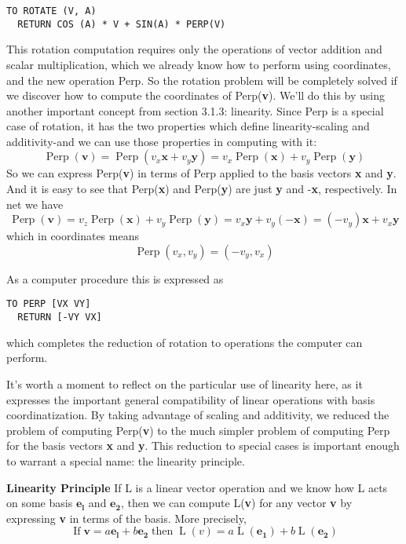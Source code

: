 \documentclass{book}
\begin{document}
\begin{verbatim}
TO ROTATE (V, A)
  RETURN COS (A) * V + SIN(A) * PERP(V)
\end{verbatim}
This rotation computation requires only the operations of vector addition and scalar multiplication, which we already know how to perform
using coordinates, and the new operation Perp. So the rotation problem
will be completely solved if we discover how to compute the coordinates
of Perp(\textbf{v}). We'll do this by using another important concept from section 3.1.3: linearity. Since Perp is a special case of rotation, it has the
two properties which define linearity-scaling and additivity-and we
can use those properties in computing with it:
$$\operatorname{Perp}(\mathbf{v}) = \operatorname{Perp}(v_x\mathbf{x} + v_y\mathbf{y}) = v_x\operatorname{Perp}(\mathbf{x}) + v_y\operatorname{Perp}(\mathbf{y})$$ So we can express Perp(\textbf{v}) in terms of Perp applied to the basis vectors
\textbf{x} and \textbf{y}. And it is easy to see that Perp(\textbf{x}) and Perp(\textbf{y}) are just
\textbf{y} and -\textbf{x}, respectively. In net we have
$$\operatorname{Perp}(\mathbf{v}) = v_z\operatorname{Perp}(\mathbf{x}) + v_y\operatorname{Perp}(\mathbf{y})= v_x\mathbf{y} + v_y(-\mathbf{x})= (-v_y)\mathbf{x} + v_x\textbf{y}$$
 which in coordinates means $$\operatorname{Perp}(v_x, v_y) = (-v_y, v_x)$$

As a computer procedure this is expressed as

\begin{verbatim}
TO PERP [VX VY]
  RETURN [-VY VX]
\end{verbatim}
which completes the reduction of rotation to operations the computer
can perform.

It's worth a moment to reflect on the particular use of linearity here, as
it expresses the important general compatibility of linear operations with
basis coordinatization. By taking advantage of scaling and additivity, we
reduced the problem of computing Perp(\textbf{v}) to the much simpler problem
of computing Perp for the basis vectors \textbf{x} and \textbf{y}. This reduction to
special cases is important enough to warrant a special name: the linearity
principle.

\noindent \textbf{Linearity Principle} If L is a linear vector operation and we know how L
acts on some basis $\mathbf{e_l}$ and $\mathbf{e_2}$, then we can compute L(\textbf{v}) for any vector
\textbf{v} by expressing \textbf{v} in terms of the basis. More precisely,
$$\operatorname{If} \mathbf{v} = a\mathbf{e_l} + b\mathbf{e_2} \operatorname{then} \operatorname{L}(v) = a\operatorname{L}(\mathbf{e_1}) + b\operatorname{L}(\mathbf{e_2})$$
\end{document}
